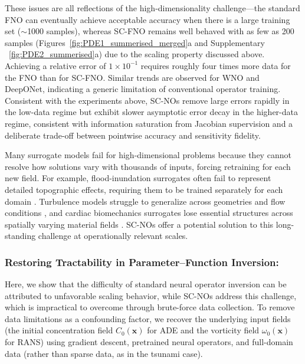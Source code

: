 These issues are all reflections of the high-dimensionality challenge—the standard FNO can eventually achieve acceptable accuracy when there is a large training set ($\sim$1000 samples), whereas SC-FNO remains well behaved with as few as 200 samples (Figures~\ref{fig:PDE1_summerised_merged}a and Supplementary ~\ref{fig:PDE2_summerised}a) due to the scaling property discussed above. Achieving a relative error of $1\times10^{-1}$ requires roughly four times more data for the FNO than for SC-FNO. Similar trends are observed for WNO and DeepONet, indicating a generic limitation of conventional operator training. Consistent with the experiments above, SC-NOs remove large errors rapidly in the low-data regime but exhibit slower asymptotic error decay in the higher-data regime, consistent with information saturation from Jacobian supervision and a deliberate trade-off between pointwise accuracy and sensitivity fidelity.

Many surrogate models fail for high-dimensional problems because they cannot resolve how solutions vary with thousands of inputs, forcing retraining for each new field. For example, flood-inundation surrogates often fail to represent detailed topographic effects, requiring them to be trained separately for each domain \citep{zanchetta2022probabilistic}. Turbulence models struggle to generalize across geometries and flow conditions \citep{duraisamy2019turbulence}, and cardiac biomechanics surrogates lose essential structures across spatially varying material fields \citep{cai2021surrogate}. SC-NOs offer a potential solution to this long-standing challenge at operationally relevant scales.




\subsubsection{Restoring Tractability in Parameter--Function Inversion:}
Here, we show that the difficulty of standard neural operator inversion can be attributed to unfavorable scaling behavior, while SC-NOs address this challenge, which is impractical to overcome through brute-force data collection. To remove data limitations as a confounding factor, we recover the underlying input fields (the initial concentration field $C_0(\mathbf{x})$ for ADE and the vorticity field $\omega_0(\mathbf{x})$ for RANS) using gradient descent, pretrained neural operators, and full-domain data (rather than sparse data, as in the tsunami case).


